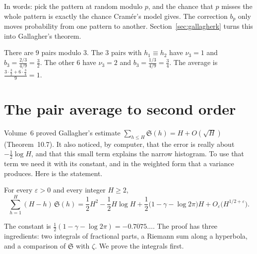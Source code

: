 In words: pick the pattern at random modulo $p$, and the chance that $p$ misses the whole pattern is exactly the chance Cram\'er's model gives. The correction $b_p$ only moves probability from one pattern to another. Section~\ref{sec:gallagherk} turns this into Gallagher's theorem.

\begin{examplex}[$k=2$, $p=3$]
There are $9$ pairs modulo $3$. The $3$ pairs with $h_1\equiv h_2$ have $\nu_3=1$ and $b_3=\frac{2/3}{4/9}=\frac32$. The other $6$ have $\nu_3=2$ and $b_3=\frac{1/3}{4/9}=\frac34$. The average is $\frac{3\cdot\frac32+6\cdot\frac34}9=1$.
\end{examplex}

\section{The pair average to second order}

Volume~6 proved Gallagher's estimate $\sum_{h\le H}\mathfrak S(h)=H+O(\sqrt H)$ (Theorem~10.7). It also noticed, by computer, that the error is really about $-\frac12\log H$, and that this small term explains the narrow histogram. To use that term we need it with its constant, and in the weighted form that a variance produces. Here is the statement.

\begin{theorem}\label{thm:pairexpansion}
For every $\varepsilon>0$ and every integer $H\ge2$,
\[
\sum_{h=1}^H(H-h)\,\mathfrak S(h)=\frac12H^2-\frac12H\log H+\frac12\bigl(1-\gamma-\log2\pi\bigr)H+O_\varepsilon\bigl(H^{1/2+\varepsilon}\bigr).
\]
\end{theorem}

The constant is $\frac12(1-\gamma-\log2\pi)=-0.7075\ldots$. The proof has three ingredients: two integrals of fractional parts, a Riemann sum along a hyperbola, and a comparison of $\mathfrak S$ with $\zeta$. We prove the integrals first.

